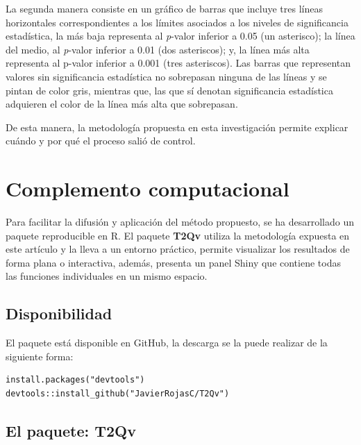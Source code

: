 \documentclass[water,article,submit,moreauthors,pdftex]{mdpi}
\begin{document}
La segunda manera consiste en un gráfico de barras que incluye tres
líneas horizontales correspondientes a los límites asociados a los
niveles de significancia estadística, la más baja representa al
\emph{p}-valor inferior a 0.05 (un asterisco); la línea del medio, al
\emph{p}-valor inferior a 0.01 (dos asteriscos); y, la línea más alta
representa al p-valor inferior a 0.001 (tres asteriscos). Las barras que
representan valores sin significancia estadística no sobrepasan ninguna
de las líneas y se pintan de color gris, mientras que, las que sí
denotan significancia estadística adquieren el color de la línea más
alta que sobrepasan.

De esta manera, la metodología propuesta en esta investigación permite
explicar cuándo y por qué el proceso salió de control.

\hypertarget{complemento-computacional}{%
\section{Complemento computacional}\label{complemento-computacional}}

Para facilitar la difusión y aplicación del método propuesto, se ha
desarrollado un paquete reproducible en R. El paquete \textbf{T2Qv}
utiliza la metodología expuesta en este artículo y la lleva a un entorno
práctico, permite visualizar los resultados de forma plana o
interactiva, además, presenta un panel Shiny que contiene todas las
funciones individuales en un mismo espacio.

\hypertarget{disponibilidad}{%
\subsection{Disponibilidad}\label{disponibilidad}}

El paquete está disponible en GitHub, la descarga se la puede realizar
de la siguiente forma:

\begin{verbatim}
install.packages("devtools")
devtools::install_github("JavierRojasC/T2Qv")
\end{verbatim}

\hypertarget{el-paquete-t2qv}{%
\subsection{El paquete: T2Qv}\label{el-paquete-t2qv}}
\end{document}
